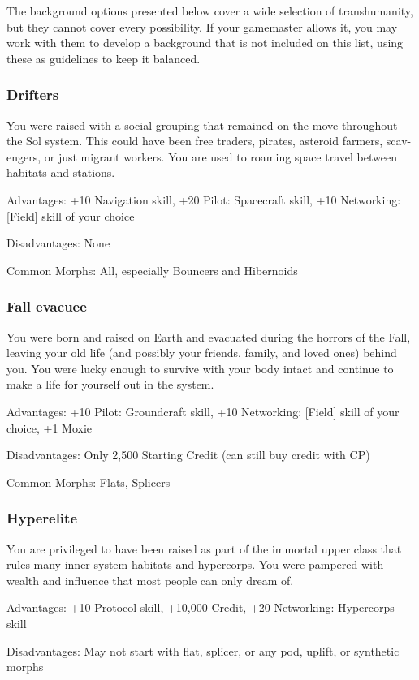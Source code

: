 The background options presented below cover a wide selection of transhumanity,
but they cannot cover every possibility. If your gamemaster allows it, you may
work with them to develop a background that is not included on this list, using
these as guidelines to keep it balanced.

\subsubsection{Drifters}
You were raised with a social grouping that remained on the move throughout the
Sol system. This could have been free traders, pirates, asteroid farmers, scav-
engers, or just migrant workers. You are used to roaming space travel between
habitats and stations.
 
Advantages: +10 Navigation skill, +20 Pilot: Spacecraft skill, +10 Networking:
[Field] skill of your choice

Disadvantages: None

Common Morphs: All, especially Bouncers and Hibernoids

\subsubsection{Fall evacuee} %
You were born and raised on Earth and evacuated during the horrors of the Fall,
leaving your old life (and possibly your friends, family, and loved ones)
behind you. You were lucky enough to survive with your body intact and continue
to make a life for yourself out in the system.

Advantages: +10 Pilot: Groundcraft skill, +10 Networking: [Field] skill of your
choice, +1 Moxie

Disadvantages: Only 2,500 Starting Credit (can still buy credit with CP)

Common Morphs: Flats, Splicers

\subsubsection{Hyperelite} %
You are privileged to have been raised as part of the immortal upper class that
rules many inner system habitats and hypercorps. You were pampered with wealth
and influence that most people can only dream of.

Advantages: +10 Protocol skill, +10,000 Credit, +20 Networking: Hypercorps
skill

Disadvantages: May not start with flat, splicer, or any pod, uplift, or
synthetic morphs


